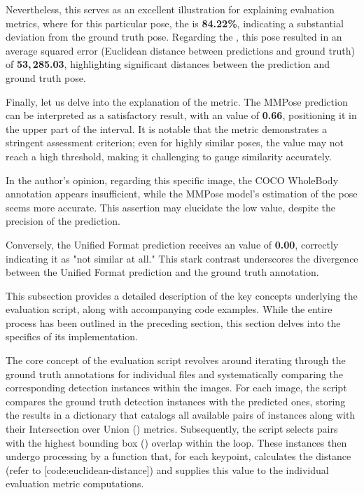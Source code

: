 Nevertheless, this serves as an excellent illustration for explaining evaluation metrics, where for this particular pose, the {\bf \APE} is {\bf 84.22\%}, indicating a substantial deviation from the ground truth pose. Regarding the {\bf \MSE}, this pose resulted in an average squared error (Euclidean distance between predictions and ground truth) of {\bf 53,\,285.03}, highlighting significant distances between the prediction and ground truth pose.

Finally, let us delve into the explanation of the {\bf \OKS} metric. The MMPose prediction can be interpreted as a satisfactory result, with an {\bf \OKS} value of {\bf 0.66}, positioning it in the upper part of the interval. It is notable that the {\bf \OKS} metric demonstrates a stringent assessment criterion; even for highly similar poses, the value may not reach a high threshold, making it challenging to gauge similarity accurately.

In the author's opinion, regarding this specific image, the COCO WholeBody annotation appears insufficient, while the MMPose model's estimation of the pose seems more accurate. This assertion may elucidate the low {\bf \OKS} value, despite the precision of the prediction.

Conversely, the Unified Format prediction receives an {\bf \OKS} value of {\bf 0.00}, correctly indicating it as "not similar at all." This stark contrast underscores the divergence between the Unified Format prediction and the ground truth annotation.


This subsection provides a detailed description of the key concepts underlying the evaluation script, along with accompanying code examples. While the entire process has been outlined in the preceding section, this section delves into the specifics of its implementation.

The core concept of the evaluation script revolves around iterating through the ground truth annotations for individual files and systematically comparing the corresponding detection instances within the images. For each image, the script compares the ground truth detection instances with the predicted ones, storing the results in a dictionary that catalogs all available pairs of instances along with their Intersection over Union (\IoU) metrics. Subsequently, the script selects pairs with the highest bounding box (\BBOX) overlap within the loop. These instances then undergo processing by a function that, for each keypoint, calculates the distance (refer to [code:euclidean-distance]) and supplies this value to the individual evaluation metric computations.

